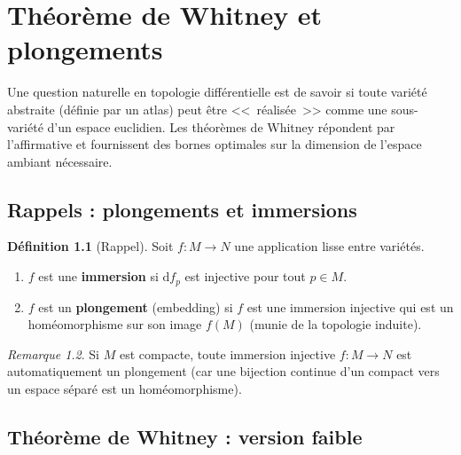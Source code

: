 \documentclass[12pt,a4paper,openany]{book}
\theoremstyle{definition}
\newtheorem{definition}{Définition}[chapter]
\theoremstyle{plain}
\theoremstyle{remark}
\newtheorem{remarque}[definition]{Remarque}
\newcommand{\dd}{\mathrm{d}}
\begin{document}
\chapter{Théorème de Whitney et plongements}\label{chap:whitney}
\minitoc

\vspace{1cm}

Une question naturelle en topologie différentielle est de savoir si toute variété
abstraite (définie par un atlas) peut être <<~réalisée~>> comme une sous-variété
d'un espace euclidien. Les théorèmes de Whitney
répondent par l'affirmative et fournissent des bornes optimales sur la dimension
de l'espace ambiant nécessaire.

\section{Rappels : plongements et immersions}\label{sec:whitney-rappels}

\begin{definition}[Rappel]\label{def:plongement-immersion-rappel}
Soit $f : M \to N$ une application lisse entre variétés.
\begin{enumerate}[label=(\roman*)]
  \item $f$ est une \textbf{immersion} si $\dd f_p$ est
    injective pour tout $p \in M$.
  \item $f$ est un \textbf{plongement} (embedding) si $f$ est
    une immersion injective qui est un homéomorphisme sur son image $f(M)$
    (munie de la topologie induite).
\end{enumerate}
\end{definition}

\begin{remarque}
Si $M$ est compacte, toute immersion injective $f : M \to N$ est automatiquement
un plongement (car une bijection continue d'un compact vers un espace séparé est
un homéomorphisme).
\end{remarque}

\section{Théorème de Whitney : version faible}\label{sec:whitney-faible}
\end{document}
